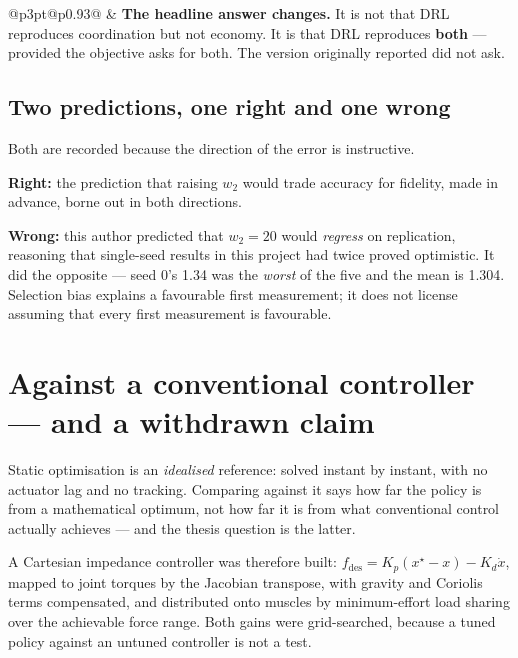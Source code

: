 \begin{center}
\begin{tabular}{@{}p{3pt}@{\hspace{10pt}}p{0.93\linewidth}@{}}
 & \textbf{The headline answer changes.} It is not that DRL
reproduces coordination but not economy. It is that DRL reproduces
\textbf{both} --- provided the objective asks for both. The version originally
reported did not ask.
\end{tabular}
\end{center}

\subsection{Two predictions, one right and one wrong}

Both are recorded because the direction of the error is instructive.

\textbf{Right:} the prediction that raising $w_2$ would trade accuracy for
fidelity, made in advance, borne out in both directions.

\textbf{Wrong:} this author predicted that $w_2 = 20$ would \emph{regress} on
replication, reasoning that single-seed results in this project had twice proved
optimistic. It did the opposite --- seed 0's 1.34 was the \emph{worst} of the
five and the mean is 1.304. Selection bias explains a favourable first
measurement; it does not license assuming that every first measurement is
favourable.

\section{Against a conventional controller --- and a withdrawn claim}

Static optimisation is an \emph{idealised} reference: solved instant by instant,
with no actuator lag and no tracking. Comparing against it says how far the
policy is from a mathematical optimum, not how far it is from what conventional
control actually achieves --- and the thesis question is the latter.

A Cartesian impedance controller was therefore built:
$f_{\text{des}} = K_p(x^\star - x) - K_d\dot{x}$, mapped to joint torques by the
Jacobian transpose, with gravity and Coriolis terms compensated, and distributed
onto muscles by minimum-effort load sharing over the achievable force range. Both
gains were grid-searched, because a tuned policy against an untuned controller is
not a test.

